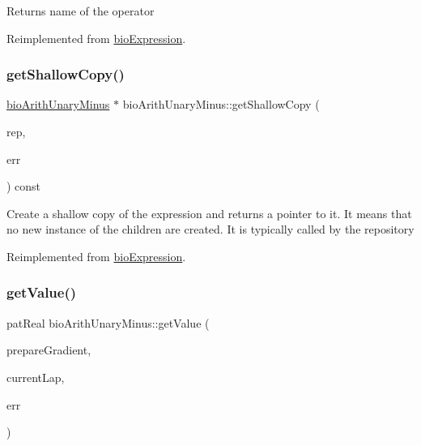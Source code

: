 \begin{DoxyReturn}{Returns}
name of the operator 
\end{DoxyReturn}


Reimplemented from \hyperlink{classbio_expression_a2353a4afb3a2b0af7c63aba086a72bde}{bio\+Expression}.

\mbox{\label{classbio_arith_unary_minus_af7d31f14e0e619536f33c45fedb7fa79}} 
\subsubsection{\texorpdfstring{get\+Shallow\+Copy()}{getShallowCopy()}}
{\footnotesize\ttfamily \hyperlink{classbio_arith_unary_minus}{bio\+Arith\+Unary\+Minus} $\ast$ bio\+Arith\+Unary\+Minus\+::get\+Shallow\+Copy (\begin{DoxyParamCaption}\item[{\hyperlink{classbio_expression_repository}{bio\+Expression\+Repository} $\ast$}]{rep,  }\item[{pat\+Error $\ast$\&}]{err }\end{DoxyParamCaption}) const\hspace{0.3cm}{\ttfamily [virtual]}}

Create a shallow copy of the expression and returns a pointer to it. It means that no new instance of the children are created. It is typically called by the repository 

Reimplemented from \hyperlink{classbio_expression_a442534762693b92baaf33928979a1bf8}{bio\+Expression}.

\mbox{\label{classbio_arith_unary_minus_a0a31abb1d5a352b933c2d07cb2c657c8}} 
\subsubsection{\texorpdfstring{get\+Value()}{getValue()}}
{\footnotesize\ttfamily pat\+Real bio\+Arith\+Unary\+Minus\+::get\+Value (\begin{DoxyParamCaption}\item[{pat\+Boolean}]{prepare\+Gradient,  }\item[{pat\+U\+Long}]{current\+Lap,  }\item[{pat\+Error $\ast$\&}]{err }\end{DoxyParamCaption})\hspace{0.3cm}{\ttfamily [virtual]}}

